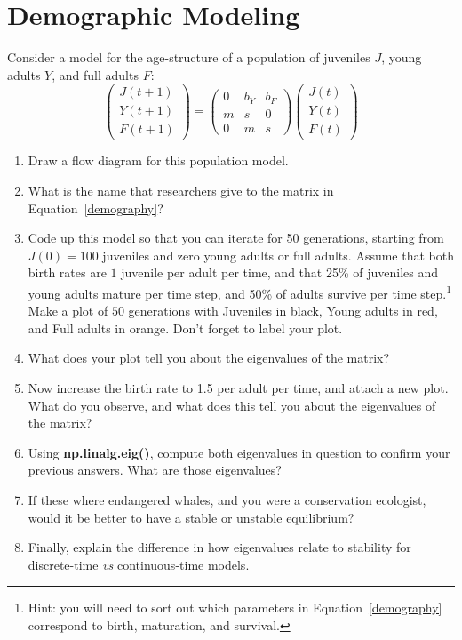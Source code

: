 \documentclass[11pt,onecolumn,superscriptaddress,notitlepage]{article}
\begin{document}
\clearpage
\section*{Demographic Modeling}

Consider a model for the age-structure of a population of juveniles $J$, young adults $Y$, and full adults $F$:
\begin{equation}
	\begin{pmatrix}
		J(t+1) \\ Y(t+1) \\ F(t+1)
	\end{pmatrix}
	= 
	\begin{pmatrix}
		0 & b_Y & b_F \\ 
		m & s & 0 \\
		0 & m & s
	\end{pmatrix}
	\begin{pmatrix}
		J(t) \\ Y(t) \\ F(t)
	\end{pmatrix}
	\label{demography}
\end{equation}

\begin{enumerate}[resume]
	\item Draw a flow diagram for this population model.
	\item What is the name that researchers give to the matrix in Equation~\eqref{demography}?
	\item Code up this model so that you can iterate for 50 generations, starting from $J(0)=100$ juveniles and zero young adults or full adults. Assume that both birth rates are $1$ juvenile per adult per time, and that 25\% of juveniles and young adults mature per time step, and 50\% of adults survive per time step.\footnote{Hint: you will need to sort out which parameters in Equation~\eqref{demography} correspond to birth, maturation, and survival.} Make a plot of $50$ generations with Juveniles in black, Young adults in red, and Full adults in orange. Don't forget to label your plot.
	\item What does your plot tell you about the eigenvalues of the matrix?
	\item Now increase the birth rate to 1.5 per adult per time, and attach a new plot. What do you observe, and what does this tell you about the eigenvalues of the matrix? 
	\item Using {\bf np.linalg.eig()}, compute both eigenvalues in question to confirm your previous answers. What are those eigenvalues?
	\item If these where endangered whales, and you were a conservation ecologist, would it be better to have a stable or unstable equilibrium?
	\item Finally, explain the difference in how eigenvalues relate to stability for discrete-time {\it vs} continuous-time models. 
\end{enumerate}
\end{document}
